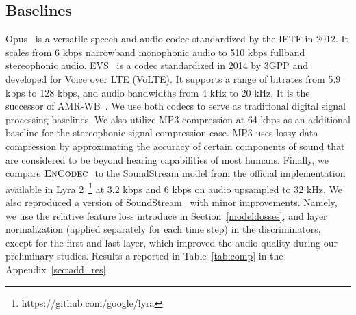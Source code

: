 \subsection{Baselines}

Opus~\citep{valin2012definition} is a versatile speech and audio codec standardized by the IETF in 2012. 
It scales from 6 kbps narrowband monophonic audio to 510 kbps fullband stereophonic audio. EVS~\citep{dietz2015overview} is a codec standardized in 2014 by 3GPP and developed for Voice over LTE (VoLTE).
It supports a range of bitrates from 5.9 kbps to 128 kbps, and audio bandwidths from 4 kHz to 20 kHz. It is the successor of AMR-WB~\citep{bhagat2012adaptive}.%
We use both codecs to serve as traditional digital signal processing baselines. We also utilize MP3 compression at 64 kbps as an additional baseline for the stereophonic signal compression case. MP3 uses lossy data compression by approximating the accuracy of certain components of sound that are considered to be beyond hearing capabilities of most humans. Finally, we compare $\textsc{EnCodec}~$ to the SoundStream model from the official implementation available in Lyra 2~\footnote{https://github.com/google/lyra} at 3.2 kbps and 6 kbps on audio upsampled to 32 kHz.
We also reproduced a version of SoundStream~\citep{zeghidour2021soundstream} with minor improvements. Namely, we use the relative feature loss introduce in Section~\ref{model:losses}, and layer normalization (applied separately for each time step) in the discriminators, except for the first and last layer, which improved the audio quality during our preliminary studies. Results a reported in Table~\ref{tab:comp} in the Appendix~\ref{sec:add_res}.


